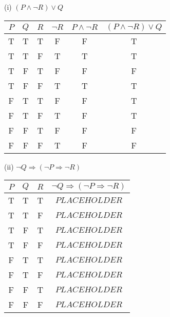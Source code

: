 \documentclass{article}
\begin{document}
(i) $(P \land \neg R) \lor Q$\\
\begin{tabular}{|c|c|c|c|c|c|}
    \hline
    $P$ & $Q$ & $R$ & $\neg R$ & $ P \land \neg R$ & $(P \land \neg R) \lor Q$ \\
    \hline
    T   & T   & T   & F        & F                 & T                         \\
    T   & T   & F   & T        & T                 & T                         \\
    T   & F   & T   & F        & F                 & F                         \\
    T   & F   & F   & T        & T                 & T                         \\
    F   & T   & T   & F        & F                 & T                         \\
    F   & T   & F   & T        & F                 & T                         \\
    F   & F   & T   & F        & F                 & F                         \\
    F   & F   & F   & T        & F                 & F                         \\
    \hline
\end{tabular}

(ii) $\neg Q \Rightarrow (\neg P \Rightarrow \neg R)$\\
\begin{tabular}{|c|c|c|c|}
    \hline
    $P$ & $Q$ & $R$ & $\neg Q \Rightarrow (\neg P \Rightarrow \neg R)$ \\
    \hline
    T   & T   & T   & $PLACEHOLDER$                                    \\
    T   & T   & F   & $PLACEHOLDER$                                    \\
    T   & F   & T   & $PLACEHOLDER$                                    \\
    T   & F   & F   & $PLACEHOLDER$                                    \\
    F   & T   & T   & $PLACEHOLDER$                                    \\
    F   & T   & F   & $PLACEHOLDER$                                    \\
    F   & F   & T   & $PLACEHOLDER$                                    \\
    F   & F   & F   & $PLACEHOLDER$                                    \\
    \hline
\end{tabular}
\end{document}
